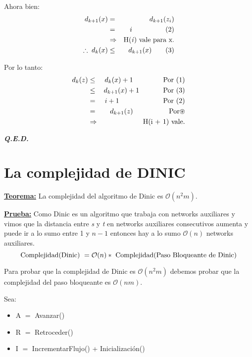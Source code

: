 \documentclass[12pt,a4paper]{report}
\newcommand{\QED}{\hfill \textit{\textbf{Q.E.D.}}}
\begin{document}
\begin{enumerate}
				\par Ahora bien:
				\begin{eqnarray}
					\nonumber d_{k + 1}(x) &=& d_{k + 1}(z_{i}) \\
					\nonumber &=& i \qquad \qquad \; \; \; (2) \\
					\nonumber &\Rightarrow & \textup{H(\textit{i}) vale para x.} \\
					\nonumber \therefore \; d_{k}(x) & \leq & d_{k + 1}(x) \qquad (3)
				\end{eqnarray}

				\par Por lo tanto:
				\begin{eqnarray}
					\nonumber d_{k}(z) &\leq & d_{k}(x) + 1 \qquad \qquad \textup{ Por } (1) \\
					\nonumber &\leq & d_{k + 1}(x) + 1 \qquad \; \; \; \; \textup{ Por (3)} \\
					\nonumber &=& i + 1 \qquad \qquad \qquad \textup{ Por } (2) \\
					\nonumber &=& d_{k + 1}(z) \qquad \qquad \; \; \; \textup{ Por} \circledast \\
					\nonumber & \Rightarrow & \textup{H(i + 1) vale.}
				\end{eqnarray}
			\end{enumerate}

		\QED

	\pagebreak
	\section{La complejidad de DINIC}
		\textbf{\underline{Teorema:}} La complejidad del algoritmo de Dinic es $\mathcal{O}(n^{2}m)$.

		\textbf{\underline{Prueba:}} Como Dinic es un algoritmo que trabaja con networks auxiliares y vimos que la distancia entre \textit{s} y \textit{t} en networks auxiliares consecutivos aumenta y puede ir a lo sumo entre 1 y $n - 1$ entonces hay a lo sumo $\mathcal{O}(n)$ networks auxiliares.
			\[ \textup{Complejidad(Dinic) } = \mathcal{O}(n) * \textup{ Complejidad(Paso Bloqueante de Dinic)} \]
			\par Para probar que la complejidad de Dinic es $\mathcal{O}(n^{2}m)$ debemos probar que la complejidad del paso bloqueante es $\mathcal{O}(nm)$.
			\vspace{3mm}
			\par Sea:
			\begin{itemize}
				\item A $=$ Avanzar()
				\item R $=$ Retroceder()
				\item I $=$ IncrementarFlujo() + Inicialización()
			\end{itemize}
\end{document}
